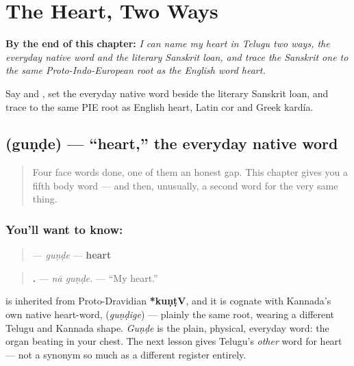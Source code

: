 
\chapter{The Heart, Two Ways}
\label{ch:te-heart}

\begin{chapteropening}
\textbf{By the end of this chapter:} \emph{I can name my heart in Telugu two ways, the everyday native word and the literary Sanskrit loan, and trace the Sanskrit one to the same Proto-Indo-European root as the English word heart.}

Say   and   , set the everyday native word beside the literary Sanskrit loan, and trace  to the same PIE root as English heart, Latin cor and Greek kardía.
\end{chapteropening}

\section[\texorpdfstring{\te{గుండె} (guṇḍe)}{గుండె (guṇḍe)}]{ (guṇḍe) — \textquotedblleft{}heart,\textquotedblright{} the everyday native word}

\label{lesson:TE-C38-gunde}



\begin{quote}
Four face words done, one of them an honest gap. This chapter gives you a fifth body word — and then, unusually, a second word for the very same thing.
\end{quote}

\subsection*{You'll want to know: }
\begin{quote}
\textbf{} — \emph{guṇḍe} — \textbf{heart}
\end{quote}

\begin{quote}
\textbf{ .} — \emph{nā guṇḍe.} — \textquotedblleft{}My heart.\textquotedblright{}
\end{quote}

\begin{cousinweb}
\textbf{} is inherited from Proto-Dravidian \textbf{*kuṇṭV}, and it is cognate with Kannada's own native heart-word, \textbf{} (\emph{guṇḍige}) — plainly the same root, wearing a different Telugu and Kannada shape. \emph{Guṇḍe} is the plain, physical, everyday word: the organ beating in your chest. The next lesson gives Telugu's \emph{other} word for heart — not a synonym so much as a different register entirely.
\end{cousinweb}

